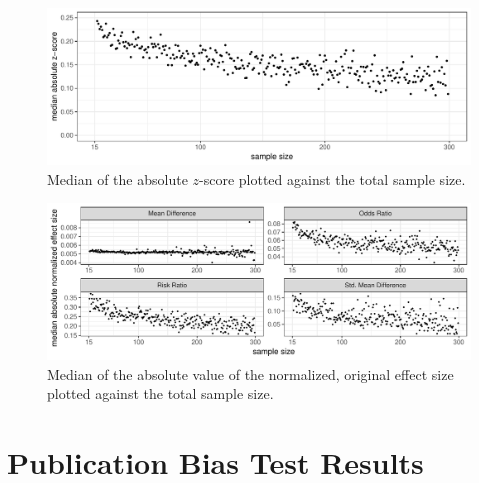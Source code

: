 \documentclass[11pt,a4paper,twoside]{book}\usepackage[]{graphicx}\usepackage[]{color}
\newenvironment{knitrout}{}{} %
\begin{document}
\begin{figure}
\begin{knitrout}
\color{fgcolor}

{\centering \includegraphics[width=\textwidth-3cm]{figure/ch03_figunnamed-chunk-11-1} 

}



\end{knitrout}
\caption{Median of the absolute $z$-score plotted against the total sample size.}
\label{z.samplesize}
\end{figure}

\begin{figure}
\begin{knitrout}
\color{fgcolor}

{\centering \includegraphics[width=\textwidth-3cm]{figure/ch03_figunnamed-chunk-12-1} 

}



\end{knitrout}
\caption{Median of the absolute value of the normalized, original effect size plotted against the total sample size.}
\label{effect.samplesize.separated}
\end{figure}



\section{Publication Bias Test Results} \label{sec:publication.bias.tests}
\end{document}
